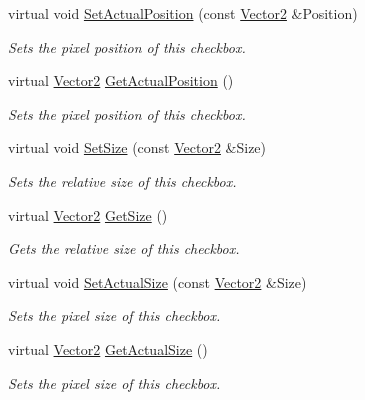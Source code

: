 \begin{DoxyCompactItemize}
virtual void \hyperlink{classphys_1_1UI_1_1CheckBox_a186fcf91ed44c813d6dbd9cb53ff60c3}{SetActualPosition} (const \hyperlink{classphys_1_1Vector2}{Vector2} \&Position)
\begin{DoxyCompactList}\small\item\em Sets the pixel position of this checkbox. \item\end{DoxyCompactList}\item 
virtual \hyperlink{classphys_1_1Vector2}{Vector2} \hyperlink{classphys_1_1UI_1_1CheckBox_a33bedaa00456be8ca0e9b2eafcd5b21a}{GetActualPosition} ()
\begin{DoxyCompactList}\small\item\em Sets the pixel position of this checkbox. \item\end{DoxyCompactList}\item 
virtual void \hyperlink{classphys_1_1UI_1_1CheckBox_a3cacea11779470e31efb6020c22e0c54}{SetSize} (const \hyperlink{classphys_1_1Vector2}{Vector2} \&Size)
\begin{DoxyCompactList}\small\item\em Sets the relative size of this checkbox. \item\end{DoxyCompactList}\item 
virtual \hyperlink{classphys_1_1Vector2}{Vector2} \hyperlink{classphys_1_1UI_1_1CheckBox_a99c6ab5087522fbd4825032b9a058585}{GetSize} ()
\begin{DoxyCompactList}\small\item\em Gets the relative size of this checkbox. \item\end{DoxyCompactList}\item 
virtual void \hyperlink{classphys_1_1UI_1_1CheckBox_a623769e2a3ba24cc1a3e2e64b72edb41}{SetActualSize} (const \hyperlink{classphys_1_1Vector2}{Vector2} \&Size)
\begin{DoxyCompactList}\small\item\em Sets the pixel size of this checkbox. \item\end{DoxyCompactList}\item 
virtual \hyperlink{classphys_1_1Vector2}{Vector2} \hyperlink{classphys_1_1UI_1_1CheckBox_aa13946ced3947a13f8f30dd97ffba245}{GetActualSize} ()
\begin{DoxyCompactList}\small\item\em Sets the pixel size of this checkbox. \item\end{DoxyCompactList}\item 

\end{DoxyCompactItemize}
